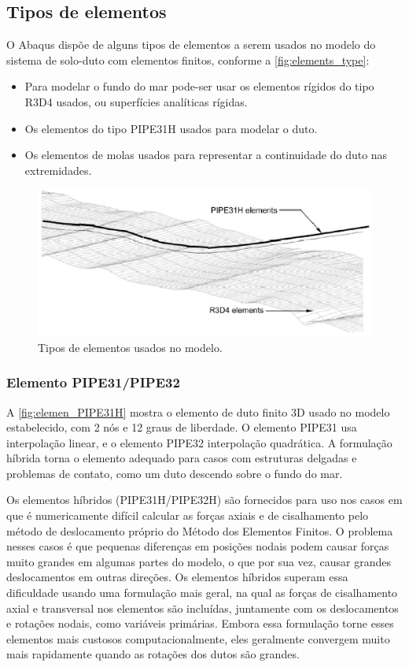 \subsection{Tipos de elementos}

O Abaqus dispõe de alguns tipos de elementos a serem usados no modelo do sistema de solo-duto com elementos finitos, conforme a \autoref{fig:elements_type}:

\begin{itemize}
    \item Para modelar o fundo do mar pode-ser usar os elementos rígidos do tipo R3D4 usados, ou superfícies analíticas rígidas.
    \item Os elementos do tipo PIPE31H usados para modelar o duto.
    \item Os elementos de molas usados para representar a continuidade do duto nas extremidades.
\end{itemize}

\begin{figure}[!ht]
    \centering
    \caption{Tipos de elementos usados no modelo.}\label{fig:elements_type}
    \includegraphics[width=0.8\linewidth]{imagens/elements_types}
\end{figure}

\subsubsection{Elemento PIPE31/PIPE32}

A \autoref{fig:elemen_PIPE31H} mostra o elemento de duto finito 3D usado no modelo estabelecido, com 2 nós e 12 graus de liberdade.
O elemento PIPE31 usa interpolação linear, e o elemento PIPE32 interpolação quadrática.
A formulação híbrida torna o elemento adequado para casos com estruturas delgadas e problemas de contato, como um duto descendo sobre o fundo do mar.

Os elementos híbridos (PIPE31H/PIPE32H) são fornecidos para uso nos casos em que é numericamente difícil calcular as forças axiais e de cisalhamento pelo método de deslocamento próprio do Método dos Elementos Finitos.
O problema nesses casos é que pequenas diferenças em posições nodais podem causar forças muito grandes em algumas partes do modelo, o que por sua vez, causar grandes deslocamentos em outras direções.
Os elementos híbridos superam essa dificuldade usando uma formulação mais geral, na qual as forças de cisalhamento axial e transversal nos elementos são incluídas, juntamente com os deslocamentos e rotações nodais, como variáveis primárias.
Embora essa formulação torne esses elementos mais custosos computacionalmente, eles geralmente convergem muito mais rapidamente quando as rotações dos dutos são grandes.

